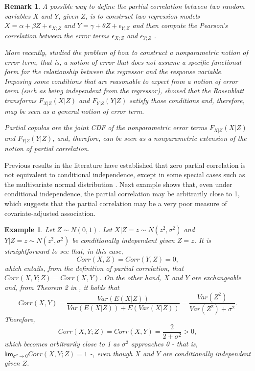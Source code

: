 \documentclass[
]{article}
\newtheorem{remark}{Remark}
\newtheorem{example}{Example}
\begin{document}
\begin{remark}\label{rem:partial-correlation}
A possible way to define the partial correlation between two random variables $X$ and $Y$, given $Z$, is to construct two regression models $X = \alpha + \beta Z + \epsilon_{X;Z}$ and $Y = \gamma + \theta Z + \epsilon_{Y;Z}$ and then compute the Pearson's correlation between the error terms $\epsilon_{X;Z}$ and $\epsilon_{Y;Z}$ \citep{kim2015}.

More recently, \cite{patra2016} studied the problem of how to construct a nonparametric notion of error term, that is, a notion of error that does not assume a specific functional form for the relationship between the regressor and the response variable. Imposing some conditions that are reasonable to expect from a notion of error term (such as being independent from the regressor), \cite{patra2016} showed that the Rosenblatt transforms $F_{X|Z}(X|Z)$ and $F_{Y|Z}(Y|Z)$ satisfy those conditions and, therefore, may be seen as a general notion of error term. \citep[for further considerations, see also Section 4 of][]{justus2024}

Partial copulas are the joint CDF of the nonparametric error terms $F_{X|Z}(X|Z)$ and $F_{Y|Z}(Y|Z)$, and, therefore, can be seen as a nonparametric extension of the notion of partial correlation.
\end{remark}

Previous results in the literature have established that zero partial
correlation is not equivalent to conditional independence, except in
some special cases such as the multivariate normal distribution
\citep{baba2004}. Next example shows that, even under conditional
independence, the partial correlation may be arbitrarily close to 1,
which suggests that the partial correlation may be a very poor measure
of covariate-adjusted association.

\begin{example}\label{ex:partial-correlation}
Let $Z \sim N(0,1)$. Let $X|Z=z \sim N(z^2, \sigma^2)$ and $Y|Z=z \sim N(z^2, \sigma^2)$ be conditionally independent given $Z=z$. It is straightforward to see that, in this case,
$$Corr(X,Z) = Corr(Y,Z) = 0,$$
which entails, from the definition of partial correlation, that $Corr(X,Y;Z) = Corr(X,Y)$. On the other hand, $X$ and $Y$ are exchangeable and, from Theorem 2 in \cite{oneill2009}, it holds that
$$Corr(X,Y) =  \frac{Var(E(X|Z))}{Var(E(X|Z)) + E(Var(X|Z))} = \frac{Var(Z^2)}{Var(Z^2) + \sigma^2}.$$
Therefore,
$$Corr(X,Y;Z) = Corr(X,Y) = \frac{2}{2 + \sigma^2} > 0,$$
which becomes arbitrarily close to 1 as $\sigma^2$ approaches 0 - that is, $\mathsf{lim}_{\sigma^2 \to 0} Corr(X,Y;Z) = 1$ -, even though $X$ and $Y$ are conditionally independent given $Z$.
\end{example}
\end{document}
